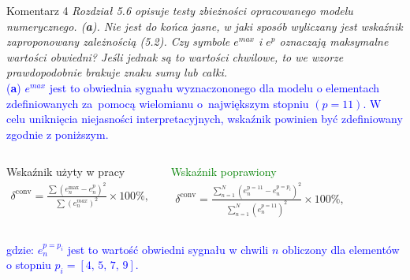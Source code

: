 \documentclass[10pt,aspectratio=169]{beamer} %
\begin{document}
\begin{frame}[label=frame6]{Komentarz 4}\justifying
\textit{Rozdział 5.6 opisuje testy zbieżności opracowanego modelu numerycznego.
(\textbf{a}). Nie jest do końca jasne, w jaki sposób wyliczany jest wskaźnik zaproponowany zależnością (5.2). Czy symbole \(e^{max}\) i \(e^p\) oznaczają maksymalne wartości obwiedni? Jeśli jednak są to wartości chwilowe, to we wzorze prawdopodobnie brakuje znaku sumy lub całki.}\\
\textcolor{blue}{(\textbf{a}) \(e^{max}\) jest to obwiednia sygnału wyznaczononego dla modelu o elementach zdefiniowanych za~pomocą wielomianu o~największym stopniu \((p=11)\). W celu uniknięcia niejasności interpretacyjnych, wskaźnik powinien być zdefiniowany zgodnie z poniższym.}
\begin{columns}
	\begin{alertblock}{Wskaźnik użyty w pracy}
	\begin{eqnarray}
		\delta^{\mathrm{conv}} = \frac{\sum{\left(e_n^{\mathrm{max}}-e_n^{p}\right)^2}}{\sum{\left(e_n^{max}\right)^2}} \times 100\%\nonumber,
	\end{eqnarray}
	\end{alertblock}
	\begin{alertblock}{\textcolor{green}{Wskaźnik poprawiony}}
		\begin{eqnarray}
			\delta^{\mathrm{conv}} = \frac{\sum_{n=1}^{N}{\left(e_n^{\mathrm{p=11}}-e_n^{p=p_i}\right)^2}}{\sum_{n=1}^N{\left(e_n^{p=11}\right)^2}} \times 100\%\nonumber,
		\end{eqnarray}
	\end{alertblock}

\end{columns}
\textcolor{blue}{gdzie: $e_n^{p=p_i}$ jest to wartość obwiedni sygnału w chwili $n$ obliczony  dla elementów o stopniu \(p_i = [4,\,5,\,7,\,9]\).}
\end{frame}
\end{document}
